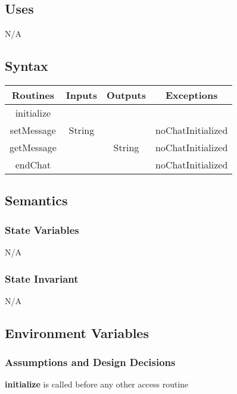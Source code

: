 \documentclass[12pt, titlepage]{article}
\begin{document}
    \subsection*{Uses}
        N/A
    
    \subsection*{Syntax}
        
        \begin{center}
            \begin{tabular}{|c|c|c|c|} 
                \hline
                Routines & Inputs & Outputs & Exceptions \\
                \hline
                initialize & & &\\
                \hline
                setMessage & String &  & noChatInitialized\\ 
                \hline
                getMessage &  & String & noChatInitialized\\
                \hline
                endChat & & & noChatInitialized\\
                \hline
            \end{tabular}
        \end{center}
    
    \subsection*{Semantics}
        \subsubsection*{State Variables}
            N/A
            
        \subsubsection*{State Invariant}
            N/A
            
    \subsection*{Environment Variables}
            
        \subsubsection*{Assumptions and Design Decisions}
            \textbf{initialize} is called before any other access routine
            
\end{document}
